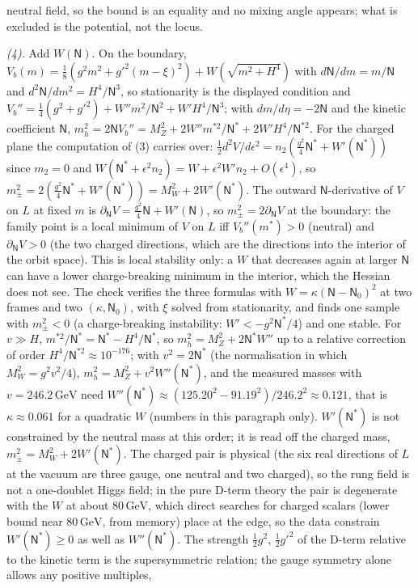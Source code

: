 neutral field, so the bound is an equality and no mixing angle appears; what is excluded is the potential, not the locus.

\emph{(4).} Add $W(\mathsf{N})$. On the boundary, $V_{b}(m) = \tfrac18(g^{2}m^{2} + g'^{2}(m - \xi)^{2}) + W(\sqrt{m^{2} + H^{4}})$ with $d\mathsf{N}/dm = m/\mathsf{N}$ and $d^{2}\mathsf{N}/dm^{2} = H^{4}/\mathsf{N}^{3}$, so stationarity is the displayed condition and $V_{b}'' = \tfrac14(g^{2} + g'^{2}) + W''m^{2}/\mathsf{N}^{2} + W'H^{4}/\mathsf{N}^{3}$; with $dm/d\eta = -2\mathsf{N}$ and the kinetic coefficient $\mathsf{N}$, $m_{h}^{2} = 2\mathsf{N} V_{b}'' = M_{Z}^{2} + 2W''m^{*2}/\mathsf{N}^{*} + 2W'H^{4}/\mathsf{N}^{*2}$. For the charged plane the computation of (3) carries over: $\tfrac12 d^{2}V/d\epsilon^{2} = n_{2}(\tfrac{g^{2}}{4}\mathsf{N}^{*} + W'(\mathsf{N}^{*}))$ since $m_{2} = 0$ and $W(\mathsf{N}^{*} + \epsilon^{2}n_{2}) = W + \epsilon^{2}W'n_{2} + O(\epsilon^{4})$, so $m_{\pm}^{2} = 2(\tfrac{g^{2}}{4}\mathsf{N}^{*} + W'(\mathsf{N}^{*})) = M_{W}^{2} + 2W'(\mathsf{N}^{*})$. The outward $\mathsf{N}$-derivative of $V$ on $L$ at fixed $m$ is $\partial_{\mathsf{N}}V = \tfrac{g^{2}}{4}\mathsf{N} + W'(\mathsf{N})$, so $m_{\pm}^{2} = 2\partial_{\mathsf{N}}V$ at the boundary: the family point is a local minimum of $V$ on $L$ iff $V_{b}''(m^{*}) > 0$ (neutral) and $\partial_{\mathsf{N}}V > 0$ (the two charged directions, which are the directions into the interior of the orbit space). This is local stability only: a $W$ that decreases again at larger $\mathsf{N}$ can have a lower charge-breaking minimum in the interior, which the Hessian does not see. The check verifies the three formulas with $W = \kappa(\mathsf{N} - \mathsf{N}_{0})^{2}$ at two frames and two $(\kappa, \mathsf{N}_{0})$, with $\xi$ solved from stationarity, and finds one sample with $m_{\pm}^{2} < 0$ (a charge-breaking instability: $W' < -g^{2}\mathsf{N}^{*}/4$) and one stable. For $v \gg H$, $m^{*2}/\mathsf{N}^{*} = \mathsf{N}^{*} - H^{4}/\mathsf{N}^{*}$, so $m_{h}^{2} = M_{Z}^{2} + 2\mathsf{N}^{*}W''$ up to a relative correction of order $H^{4}/\mathsf{N}^{*2} \approx 10^{-176}$; with $v^{2} = 2\mathsf{N}^{*}$ (the normalisation in which $M_{W}^{2} = g^{2}v^{2}/4$), $m_{h}^{2} = M_{Z}^{2} + v^{2}W''(\mathsf{N}^{*})$, and the measured masses with $v = 246.2\,\mathrm{GeV}$ need $W''(\mathsf{N}^{*}) \approx (125.20^{2} - 91.19^{2})/246.2^{2} \approx 0.121$, that is $\kappa \approx 0.061$ for a quadratic $W$ (numbers in this paragraph only). $W'(\mathsf{N}^{*})$ is not constrained by the neutral mass at this order; it is read off the charged mass, $m_{\pm}^{2} = M_{W}^{2} + 2W'(\mathsf{N}^{*})$. The charged pair is physical (the six real directions of $L$ at the vacuum are three gauge, one neutral and two charged), so the rung field is not a one-doublet Higgs field; in the pure D-term theory the pair is degenerate with the $W$ at about $80\,\mathrm{GeV}$, which direct searches for charged scalars (lower bound near $80\,\mathrm{GeV}$, from memory) place at the edge, so the data constrain $W'(\mathsf{N}^{*}) \ge 0$ as well as $W''(\mathsf{N}^{*})$. The strength $\tfrac12 g^{2}$, $\tfrac12 g'^{2}$ of the D-term relative to the kinetic term is the supersymmetric relation; the gauge symmetry alone allows any positive multiples, 